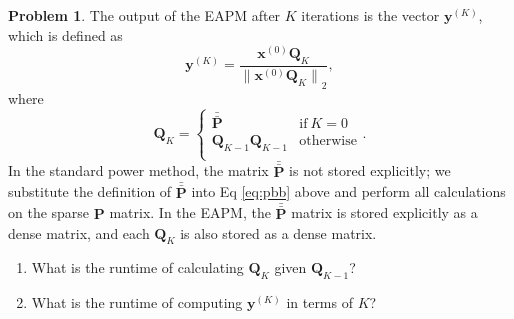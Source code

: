 \documentclass[10pt]{exam}
\theoremstyle{definition}
\newtheorem{problem}{Problem}
\newcommand{\Q}{\mathbf Q}
\newcommand{\p}{\mathbf P}
\newcommand{\pb}{\bar {\p}}
\newcommand{\pbb}{\bar {\pb}}
\newcommand{\x}{\mathbf x}
\newcommand{\y}{\mathbf y}
\newcommand{\ltwo}[1]{{\lVert {#1} \rVert}_2}
\begin{document}
\begin{problem}
    The output of the EAPM after $K$ iterations is the vector $\y^{(K)}$, which is defined as
    \begin{equation}
        \label{eq:exp:y}
        \y^{(K)} = \frac{\x^{(0)} \Q_K}{\ltwo{\x^{(0)} \Q_K}}
        ,
    \end{equation}
    where
    \begin{equation}
        \label{eq:Qk}
        \Q_K = 
        \begin{cases}
            \pbb & \text{if}~K=0 \\
            \Q_{K-1} \Q_{K-1} & \text{otherwise} \\
        \end{cases}
        .
    \end{equation}
    In the standard power method, the matrix $\pbb$ is not stored explicitly;
    we substitute the definition of $\pbb$ into Eq \eqref{eq:pbb} above and perform all calculations on the sparse $\p$ matrix.
    In the EAPM, the $\pbb$ matrix is stored explicitly as a dense matrix,
    and each $\Q_K$ is also stored as a dense matrix.

    \begin{enumerate}
%

        \newpage
        \item
            What is the runtime of calculating $\Q_K$ given $\Q_{K-1}$? 
            \vspace{4in}

        \item 
            What is the runtime of computing $\y^{(K)}$ in terms of $K$?
            \vspace{3in}


\end{enumerate}
\end{problem}
\end{document}
